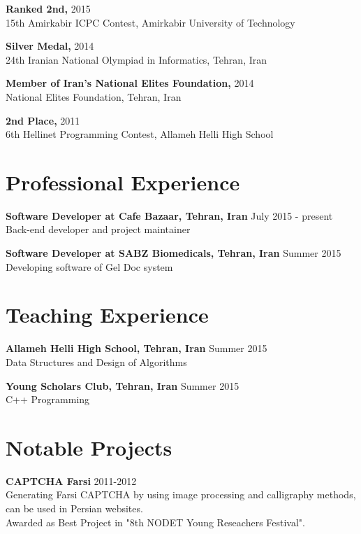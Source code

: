 \documentclass[margin]{res}
\begin{document}
\begin{resume}
    {\bf Ranked 2nd,} \hfill 2015
    \\15th Amirkabir ICPC Contest, Amirkabir University of Technology

    {\bf Silver Medal,} \hfill 2014
    \\24th Iranian National Olympiad in Informatics, Tehran, Iran
    
    {\bf Member of Iran's National Elites Foundation,} \hfill 2014
    \\National Elites Foundation, Tehran, Iran
     
    {\bf 2nd Place,} \hfill 2011
    \\6th Hellinet Programming Contest, Allameh Helli High School

\vspace{5mm}

\section{Professional Experience}
    {\bf Software Developer at Cafe Bazaar, Tehran, Iran} \hfill July 2015 - present
    \\Back-end developer and project maintainer
    
    {\bf Software Developer at SABZ Biomedicals, Tehran, Iran} \hfill Summer 2015
    \\Developing software of Gel Doc system

\vspace{5mm} 

\section{Teaching Experience}
    {\bf Allameh Helli High School, Tehran, Iran} \hfill Summer 2015
    \\Data Structures and Design of Algorithms
    
    {\bf Young Scholars Club, Tehran, Iran} \hfill Summer 2015
    \\C++ Programming

\vspace{5mm}

\section{Notable Projects} 
    {\bf CAPTCHA Farsi} \hfill 2011-2012
    \\Generating Farsi CAPTCHA by using image processing and calligraphy methods, can be used in Persian websites.
    \\Awarded as Best Project in "8th NODET Young Reseachers Festival".


\end{resume}
\end{document}
